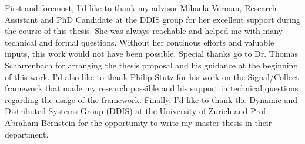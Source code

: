 \begin{acknowledgements}

\end{acknowledgements}

First and foremost, I'd like to thank my advisor Mihaela Verman, Research Assistant and PhD Candidate at the DDIS group for her excellent support during the course of this thesis. She was always reachable and helped me with many technical and formal questions. Without her continous efforts and valuable inputs, this work would not have been possible. 
\newline
Special thanks go to Dr. Thomas Scharrenbach for arranging the thesis proposal and his guidance at the beginning of this work. I'd also like to thank Philip Stutz for his work on the Signal/Collect framework that made my research possible and his support in technical questions regarding the usage of the framework.\newline
Finally, I'd like to thank the Dynamic and Distributed Systems Group (DDIS) at the University of Zurich and Prof. Abraham Bernstein for the opportunity to write my master thesis in their department.

